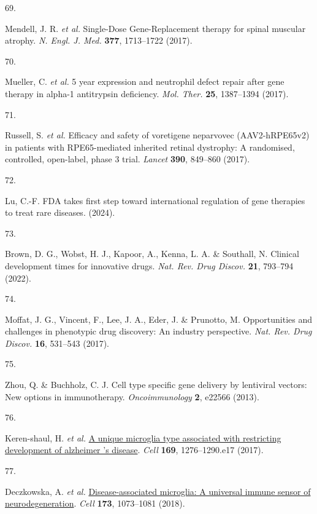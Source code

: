 \documentclass[
]{agujournal2019}
\newlength{\cslhangindent}
\newlength{\csllabelwidth}
\newenvironment{CSLReferences}[2] %
 {\begin{list}{}{%
  \setlength{\itemindent}{0pt}
  \setlength{\leftmargin}{0pt}
  \setlength{\parsep}{0pt}
  \ifodd #1
   \setlength{\leftmargin}{\cslhangindent}
   \setlength{\itemindent}{-1\cslhangindent}
  \fi
  \setlength{\itemsep}{#2\baselineskip}}}
 {\end{list}}
\newcommand{\CSLLeftMargin}[1]{\parbox[t]{\csllabelwidth}{\strut#1\strut}}
\newcommand{\CSLRightInline}[1]{\parbox[t]{\linewidth - \csllabelwidth}{\strut#1\strut}}
\begin{document}
\begin{CSLReferences}{0}{0}
\CSLLeftMargin{69. }%
\CSLRightInline{Mendell, J. R. \emph{et al.} {Single-Dose}
{Gene-Replacement} therapy for spinal muscular atrophy. \emph{N. Engl.
J. Med.} \textbf{377}, 1713--1722 (2017).}

\CSLLeftMargin{70. }%
\CSLRightInline{Mueller, C. \emph{et al.} 5 year expression and
neutrophil defect repair after gene therapy in alpha-1 antitrypsin
deficiency. \emph{Mol. Ther.} \textbf{25}, 1387--1394 (2017).}

\CSLLeftMargin{71. }%
\CSLRightInline{Russell, S. \emph{et al.} Efficacy and safety of
voretigene neparvovec ({AAV2-hRPE65v2}) in patients with
{RPE65-mediated} inherited retinal dystrophy: A randomised, controlled,
open-label, phase 3 trial. \emph{Lancet} \textbf{390}, 849--860 (2017).}

\CSLLeftMargin{72. }%
\CSLRightInline{Lu, C.-F. {FDA} takes first step toward international
regulation of gene therapies to treat rare diseases. (2024).}

\CSLLeftMargin{73. }%
\CSLRightInline{Brown, D. G., Wobst, H. J., Kapoor, A., Kenna, L. A. \&
Southall, N. Clinical development times for innovative drugs. \emph{Nat.
Rev. Drug Discov.} \textbf{21}, 793--794 (2022).}

\CSLLeftMargin{74. }%
\CSLRightInline{Moffat, J. G., Vincent, F., Lee, J. A., Eder, J. \&
Prunotto, M. Opportunities and challenges in phenotypic drug discovery:
An industry perspective. \emph{Nat. Rev. Drug Discov.} \textbf{16},
531--543 (2017).}

\CSLLeftMargin{75. }%
\CSLRightInline{Zhou, Q. \& Buchholz, C. J. Cell type specific gene
delivery by lentiviral vectors: New options in immunotherapy.
\emph{Oncoimmunology} \textbf{2}, e22566 (2013).}

\CSLLeftMargin{76. }%
\CSLRightInline{Keren-shaul, H. \emph{et al.}
\href{https://doi.org/10.1016/j.cell.2017.05.018}{A unique microglia
type associated with restricting development of alzheimer 's disease}.
\emph{Cell} \textbf{169}, 1276--1290.e17 (2017).}

\CSLLeftMargin{77. }%
\CSLRightInline{Deczkowska, A. \emph{et al.}
\href{https://doi.org/10.1016/j.cell.2018.05.003}{Disease-associated
microglia: A universal immune sensor of neurodegeneration}. \emph{Cell}
\textbf{173}, 1073--1081 (2018).}


\end{CSLReferences}
\end{document}
